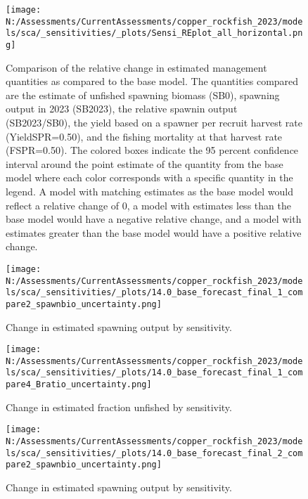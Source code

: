 \documentclass[11pt,
  english,
  letterpaper,
]{article}
\begin{document}
\begin{figure}
\centering
\texttt{[image: N:/Assessments/CurrentAssessments/copper\_rockfish\_2023/models/sca/\_sensitivities/\_plots/Sensi\_REplot\_all\_horizontal.png]}
\caption{Comparison of the relative change in estimated management quantities as compared to the base model. The quantities compared are the estimate of unfished spawning biomass (SB0), spawning output in 2023 (SB2023), the relative spawnin output (SB2023/SB0), the yield based on a spawner per recruit harvest rate (YieldSPR=0.50), and the fishing mortality at that harvest rate (FSPR=0.50). The colored boxes indicate the 95 percent confidence interval around the point estimate of the quantity from the base model where each color corresponds with a specific quantity in the legend. A model with matching estimates as the base model would reflect a relative change of 0, a model with estimates less than the base model would have a negative relative change, and a model with estimates greater than the base model would have a positive relative change.\label{fig:sens-all}}
\end{figure}

\newpage

\begin{figure}
\centering
\texttt{[image: N:/Assessments/CurrentAssessments/copper\_rockfish\_2023/models/sca/\_sensitivities/\_plots/14.0\_base\_forecast\_final\_1\_compare2\_spawnbio\_uncertainty.png]}
\caption{Change in estimated spawning output by sensitivity.\label{fig:sens-ssb-1}}
\end{figure}

\newpage

\begin{figure}
\centering
\texttt{[image: N:/Assessments/CurrentAssessments/copper\_rockfish\_2023/models/sca/\_sensitivities/\_plots/14.0\_base\_forecast\_final\_1\_compare4\_Bratio\_uncertainty.png]}
\caption{Change in estimated fraction unfished by sensitivity.\label{fig:sens-depl-1}}
\end{figure}

\newpage

\begin{figure}
\centering
\texttt{[image: N:/Assessments/CurrentAssessments/copper\_rockfish\_2023/models/sca/\_sensitivities/\_plots/14.0\_base\_forecast\_final\_2\_compare2\_spawnbio\_uncertainty.png]}
\caption{Change in estimated spawning output by sensitivity.\label{fig:sens-ssb-2}}
\end{figure}
\end{document}
